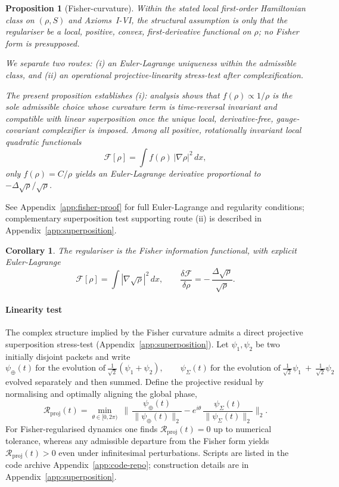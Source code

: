 \documentclass[11pt,a4paper]{article}
\numberwithin{equation}{section}
\theoremstyle{thmcompact}
\newtheorem{proposition}[theorem]{Proposition}
\newtheorem{corollary}[theorem]{Corollary}
\theoremstyle{remark}
\begin{document}
\begin{proposition}[Fisher-curvature]\label{ax4}
	Within the stated local first-order Hamiltonian class on $(\rho,S)$ and Axioms~I-VI, the structural assumption is only that the regulariser be a local, positive, convex, first-derivative functional on $\rho$; no Fisher form is presupposed.
	
	We separate two routes: (i) an Euler-Lagrange uniqueness within the admissible class, and (ii) an operational projective-linearity stress-test after complexification.
	
	The present proposition establishes (i): analysis shows that $f(\rho)\propto 1/\rho$ is the sole admissible choice whose curvature term is time-reversal invariant and compatible with linear superposition once the unique local, derivative-free, gauge-covariant complexifier is imposed.
	Among all positive, rotationally invariant local quadratic functionals
	\[
	\mathcal F[\rho]=\int f(\rho)\,|\nabla\rho|^2\,dx,
	\]
	only $f(\rho)=C/\rho$ yields an Euler-Lagrange derivative proportional to $-\Delta\sqrt\rho/\sqrt\rho$.
\end{proposition}

See Appendix~\ref{app:fisher-proof} for full Euler-Lagrange and regularity conditions; complementary superposition test supporting route (ii) is described in Appendix~\ref{app:superposition}.

\begin{corollary}
	The regulariser is the Fisher information functional, with explicit Euler-Lagrange
	\begin{equation}
		\mathcal F[\rho]=\int |\nabla\sqrt{\rho}|^2\,dx,
		\qquad
		\frac{\delta\mathcal F}{\delta\rho}
		=-\,\frac{\Delta\sqrt{\rho}}{\sqrt{\rho}}.
	\end{equation}
\end{corollary}

\paragraph{Linearity test}
The complex structure implied by the Fisher curvature admits a direct projective superposition stress-test (Appendix~\ref{app:superposition}). Let $\psi_1,\psi_2$ be two initially disjoint packets and write
\[
\psi_{\oplus}(t)\ \text{for the evolution of}\ \tfrac{1}{\sqrt{2}}(\psi_1+\psi_2),\qquad
\psi_{\Sigma}(t)\ \text{for the evolution of}\ \tfrac{1}{\sqrt{2}}\psi_1\ +\ \tfrac{1}{\sqrt{2}}\psi_2
\]
evolved separately and then summed. Define the projective residual by normalising and optimally aligning the global phase,
\[
\mathcal{R}_{\mathrm{proj}}(t)
=\min_{\theta\in[0,2\pi)}\ \Big\|\,
\frac{\psi_{\oplus}(t)}{\|\psi_{\oplus}(t)\|_{2}}
- e^{i\theta}\,\frac{\psi_{\Sigma}(t)}{\|\psi_{\Sigma}(t)\|_{2}}
\Big\|_{2}.
\]
For Fisher-regularised dynamics one finds $\mathcal{R}_{\mathrm{proj}}(t)=0$ up to numerical tolerance, whereas any admissible departure from the Fisher form yields $\mathcal{R}_{\mathrm{proj}}(t)>0$ even under infinitesimal perturbations. Scripts are listed in the code archive Appendix~\ref{app:code-repo}; construction details are in Appendix~\ref{app:superposition}.
\end{document}
